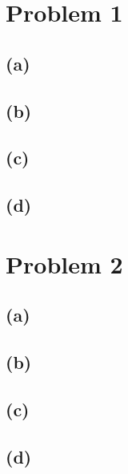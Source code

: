 \documentclass{6046}
\author{Matthew Feng}
\begin{document}
\section*{Problem 1}
\subsection*{(a)}
\subsection*{(b)}
\subsection*{(c)}
\subsection*{(d)}

\section*{Problem 2}
\subsection*{(a)}
\subsection*{(b)}
\subsection*{(c)}
\subsection*{(d)}
\end{document}
